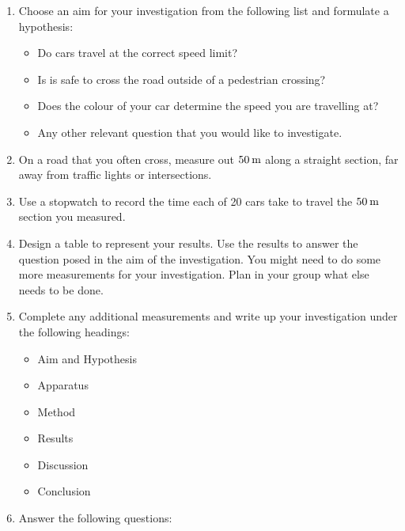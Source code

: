        \label{m38791*id67220}\begin{enumerate}[noitemsep, label=\textbf{\arabic*}. ] 
            \label{m38791*uid57}\item Choose an aim for your investigation from the following list and formulate a hypothesis:
\label{m38791*id67236}\begin{itemize}[noitemsep]
            \label{m38791*uid58}\item Do cars travel at the correct speed limit?
\label{m38791*uid59}\item Is is safe to cross the road outside of a pedestrian crossing?
\label{m38791*uid60}\item Does the colour of your car determine the speed you are travelling at?
\label{m38791*uid61}\item Any other relevant question that you would like to investigate.
\end{itemize}
        \label{m38791*uid62}\item On a road that you often cross, measure out $50\phantom{\rule{2pt}{0ex}}\mathrm{m}$ along a straight section, far away from traffic lights or intersections.
\label{m38791*uid63}\item Use a stopwatch to record the time each of 20 cars take to travel the $50\phantom{\rule{2pt}{0ex}}\mathrm{m}$ section you measured.
\label{m38791*uid64}\item Design a table to represent your results. Use the results to answer the question posed in the aim of the investigation. You might need to do some more measurements for your investigation. Plan in your group what else needs to be done.
\label{m38791*uid65}\item Complete any additional measurements and write up your investigation under the following headings:
\label{m38791*id67343}\begin{itemize}[noitemsep]
            \label{m38791*uid66}\item Aim and Hypothesis
\label{m38791*uid67}\item Apparatus
\label{m38791*uid68}\item Method
\label{m38791*uid69}\item Results
\label{m38791*uid70}\item Discussion
\label{m38791*uid71}\item Conclusion
\end{itemize}
        \label{m38791*uid72}\item Answer the following questions:
\label{m38791*id67432}\begin{enumerate}[noitemsep, label=\textbf{\alph*}. ] 

\end{enumerate}
\end{enumerate}
